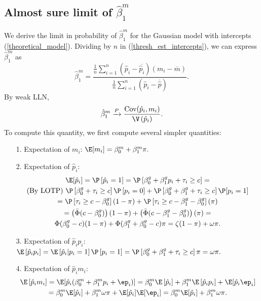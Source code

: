 \documentclass[11pt]{article}
\begin{document}
\begin{appendices}
\begin{refsection}
\subsection{Almost sure limit of $\hat{\beta}^m_1$}\label{sec:convergence}

We derive the limit in probability of $\hat{\beta}^m_1$ for the Gaussian model with intercepts (\ref{theoretical_model}). Dividing by $n$ in (\ref{thresh_est_intercepts}), we can express $\hat{\beta}^m_1$ as
$$ \hat{\beta}^m_1 = \frac{ \frac{1}{n} \sum_{i=1}^n ( \hat{p}_i - \overline{\hat{p}_i})(m_i - \overline{m})}{ \frac{1}{n} \sum_{i=1}^n (\hat{p}_i - \overline{\hat{p}})}.$$ By weak LLN,
$$ \hat{\beta}^m_1 \xrightarrow{P} \frac{\textrm{Cov}(\hat{p}_i, m_i)}{\V\left(\hat{p}_i\right)}.$$ To compute this quantity, we first compute several simpler quantities:
\begin{itemize}
\item[1.] Expectation of $m_i$: $\E[m_i] = \beta^m_0 + \beta^m_1\pi.$
\item[2.] Expectation of $\hat{p}_i$: \begin{multline*}
\E[\hat{p}_i] = \P\left[\hat{p}_i = 1\right] = \P\left[\beta^g_0 + \beta^g_1 p_i + \tau_i \geq c \right] = \\ \textrm{(By LOTP) } \P\left[ \beta^g_0 + \tau_i \geq c \right]\P\left[p_i = 0\right] + \P\left[ \beta^g_0 + \beta^g_1 + \tau_i \geq c \right] \P[p_i = 1] \\ = \P\left[ \tau_i \geq c - \beta^g_0\right](1- \pi) + \P\left[ \tau_i \geq c - \beta^g_1 - \beta^g_0 \right](\pi) \\ =  \left(\bar{\Phi}(c - \beta^g_0) \right) (1 - \pi) + \left( \bar{\Phi}(c - \beta^g_1 - \beta^g_0) \right)(\pi) = \\  \Phi(\beta^g_0 - c) (1-\pi) + \Phi(\beta^g_1 + \beta^g_0 - c) \pi = \zeta(1-\pi) + \omega \pi.
\end{multline*}
\item[3.] Expectation of $\hat{p}_i p_i$: 
$\E\left[ \hat{p}_i p_i \right] = \E\left[\hat{p}_i | p_i = 1 \right] \P\left[ p_i =1 \right] = \P\left[ \beta^g_0 + \beta^g_1 + \tau_i \geq c \right] \pi = \omega \pi.$
\item[4.] Expectation of $\hat{p}_i m_i$:
\begin{multline*}
\E\left[\hat{p}_i m_i\right] = \E[\hat{p}_i (\beta^m_0 + \beta^m_1 p_i + \ep_i)] = \beta^m_0 \E\left[\hat{p}_i\right] + \beta^m_1 \E\left[\hat{p}_i p_i\right] + \E[\hat{p}_i \ep_i] \\ = \beta^m_0 \E[\hat{p}_i] + \beta^m_1 \omega \pi + \E[\hat{p}_i] \E[\ep_i] = \beta^m_0 \E[\hat{p}_i] + \beta^m_1 \omega \pi.

\end{multline*}
\end{itemize}
\end{refsection}
\end{appendices}
\end{document}
